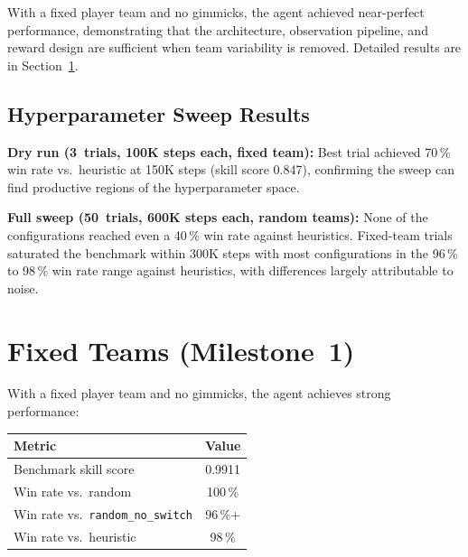 With a fixed player team and no gimmicks, the agent achieved near-perfect
performance, demonstrating that the architecture, observation pipeline, and
reward design are sufficient when team variability is removed.  Detailed
results are in Section~\ref{sec:fixed_teams_results}.

\subsection{Hyperparameter Sweep Results}

\textbf{Dry run (3~trials, 100K steps each, fixed team):} Best trial achieved
70\,\% win rate vs.\ heuristic at 150K steps (skill score 0.847), confirming
the sweep can find productive regions of the hyperparameter space.

\textbf{Full sweep (50~trials, 600K steps each, random teams):} None of the
configurations reached even a 40\,\% win rate against heuristics.  Fixed-team
trials saturated the benchmark within 300K steps with most configurations in
the 96\,\% to 98\,\% win rate range against heuristics, with differences
largely attributable to noise.


\section{Fixed Teams (Milestone~1)}
\label{sec:fixed_teams_results}

With a fixed player team and no gimmicks, the agent achieves strong
performance:

\begin{center}
\small
\begin{tabularx}{0.8\textwidth}{l c}
  \toprule
  \textbf{Metric} & \textbf{Value} \\
  \midrule
  Benchmark skill score        & 0.9911 \\
  Win rate vs.\ random         & 100\,\% \\
  Win rate vs.\ \texttt{random\_no\_switch} & 96\,\%+ \\
  Win rate vs.\ heuristic      & 98\,\% \\
  \bottomrule
\end{tabularx}
\end{center}


